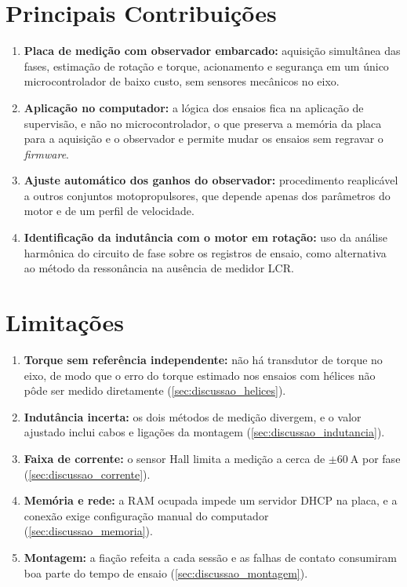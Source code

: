 \section{Principais Contribuições}
\label{sec:contribuicoes}

\begin{enumerate}
    \item \textbf{Placa de medição com observador embarcado:} aquisição
    simultânea das fases, estimação de rotação e torque, acionamento e
    segurança em um único microcontrolador de baixo custo, sem sensores
    mecânicos no eixo.
    \item \textbf{Aplicação no computador:} a lógica dos ensaios fica na
    aplicação de supervisão, e não no microcontrolador, o que preserva a
    memória da placa para a aquisição e o observador e permite mudar os
    ensaios sem regravar o \textit{firmware}.
    \item \textbf{Ajuste automático dos ganhos do observador:} procedimento
    reaplicável a outros conjuntos motopropulsores, que depende apenas dos
    parâmetros do motor e de um perfil de velocidade.
    \item \textbf{Identificação da indutância com o motor em rotação:} uso da
    análise harmônica do circuito de fase sobre os registros de ensaio, como
    alternativa ao método da ressonância na ausência de medidor LCR.
\end{enumerate}

\section{Limitações}
\label{sec:limitacoes}

\begin{enumerate}
    \item \textbf{Torque sem referência independente:} não há transdutor de
    torque no eixo, de modo que o erro do torque estimado nos ensaios com
    hélices não pôde ser medido diretamente
    (\autoref{sec:discussao_helices}).
    \item \textbf{Indutância incerta:} os dois métodos de medição divergem, e o
    valor ajustado inclui cabos e ligações da montagem
    (\autoref{sec:discussao_indutancia}).
    \item \textbf{Faixa de corrente:} o sensor Hall limita a medição a cerca de
    $\pm\SI{60}{\ampere}$ por fase (\autoref{sec:discussao_corrente}).
    \item \textbf{Memória e rede:} a RAM ocupada impede um servidor DHCP na
    placa, e a conexão exige configuração manual do computador
    (\autoref{sec:discussao_memoria}).
    \item \textbf{Montagem:} a fiação refeita a cada sessão e as falhas de
    contato consumiram boa parte do tempo de ensaio
    (\autoref{sec:discussao_montagem}).
\end{enumerate}
